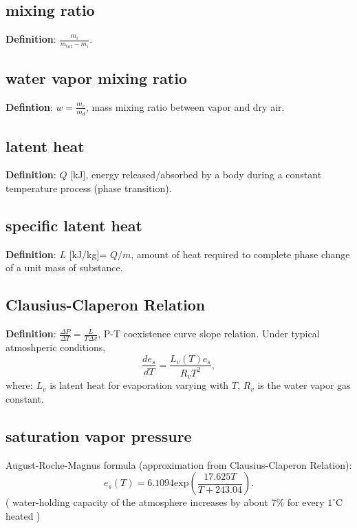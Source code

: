 \subsection{mixing ratio}
{\bf Definition}: $ \frac{m_i}{m_{\text{tot}}-m_i} $.

\subsection{water vapor mixing ratio}
{\bf Defintion}: $ w = \frac{m_v}{m_d}$, mass mixing ratio between vapor and dry air.


\subsection{latent heat}
{\bf Definition}: $Q$ [kJ], energy released/absorbed by a body during a constant temperature process
(phase transition).

\subsection{specific latent heat}
{\bf Definition}: $L$ [kJ/kg]= $Q/m$, amount of heat required to complete phase change of a unit
mass of substance.

\subsection{Clausius-Claperon Relation}
{\bf Definition}: $\frac{\Delta P}{\Delta T} = \frac{L}{T\Delta v}$, P-T coexistence curve slope
relation. Under typical atmoshperic conditions, 
\begin{equation}
   \frac{d e_s}{dT} = \frac{L_v(T)e_s}{R_vT^2}, 
\end{equation}
where: $L_v$ is latent heat for evaporation varying with $T$, $R_v$ is the water vapor gas constant.
\\


\subsection{saturation vapor pressure}
August-Roche-Magnus formula (approximation from Clausius-Claperon Relation): \\
\begin{equation}
   e_s(T) = 6.1094 \text{exp}(\frac{17.625T}{T+243.04}).
\end{equation}
( water-holding capacity of the atmosphere increases by about $7\%$ for every $1^{\circ}$C heated )

